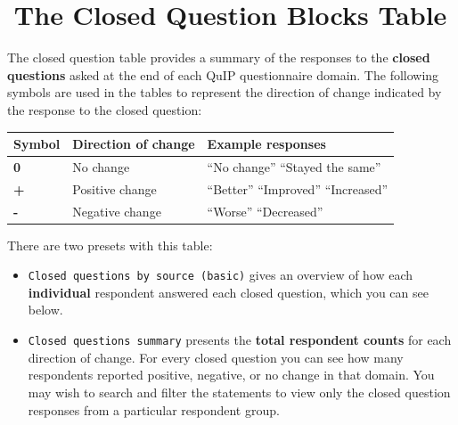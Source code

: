 \documentclass[
]{book}
\providecommand{\tightlist}{%
  \setlength{\itemsep}{0pt}\setlength{\parskip}{0pt}}
\begin{document}
\hypertarget{the-closed-question-blocks-table}{%
\chapter{🧪The Closed Question Blocks Table}\label{the-closed-question-blocks-table}}

The closed question table provides a summary of the responses to the \textbf{closed questions} asked at the end of each QuIP questionnaire domain. The following symbols are used in the tables to represent the direction of change indicated by the response to the closed question:

\begin{longtable}[]{@{}lll@{}}
\toprule
\textbf{Symbol} & \textbf{Direction of change} & \textbf{Example responses} \\
\midrule
\endhead
\textbf{0} & No change & ``No change'' ``Stayed the same'' \\
\textbf{+} & Positive change & ``Better'' ``Improved'' ``Increased'' \\
\textbf{-} & Negative change & ``Worse'' ``Decreased'' \\
\bottomrule
\end{longtable}

There are two presets with this table:

\begin{itemize}
\tightlist
\item
  \texttt{Closed\ questions\ by\ source\ (basic)} gives an overview of how each \textbf{individual} respondent answered each closed question, which you can see below.
\item
  \texttt{Closed\ questions\ summary} presents the \textbf{total respondent counts} for each direction of change. For every closed question you can see how many respondents reported positive, negative, or no change in that domain. You may wish to search and filter the statements to view only the closed question responses from a particular respondent group.
\end{itemize}
\end{document}
